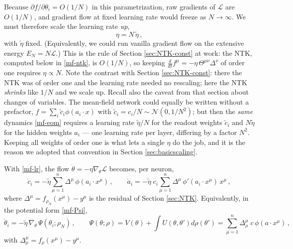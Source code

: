 \documentclass[11pt]{article}
\newcommand{\CN}{{\mathcal N}}
\newcommand{\CL}{{\mathcal L}}
\newcommand{\pd}{\partial}
\begin{document}
Because $\pd f/\pd \theta_i = O(1/N)$ in this parametrization, raw gradients of $\CL$ are $O(1/N)$, and gradient flow at fixed learning rate would freeze as $N\to\infty$. We must therefore scale the learning rate \emph{up},
%
\begin{equation} \label{mf-lr}
    \eta = N\,\tilde\eta\,,
\end{equation}
%
with $\tilde\eta$ fixed. (Equivalently, we could run vanilla gradient flow on the extensive energy $E_N=N\CL$.) This is the rule of Section \ref{sec:NTK-const} at work: the NTK, computed below in \eqref{mf-ntk}, is $O(1/N)$, so keeping $\frac{d}{dt}f^\mu = -\eta\,\Theta^{\mu\nu}\Delta^\nu$ of order one requires $\eta\propto N$. Note the contrast with Section \ref{sec:NTK-const}: there the NTK was of order one and the learning rate needed no rescaling; here the NTK \emph{shrinks} like $1/N$ and we scale up. Recall also the caveat from that section about changes of variables. The mean-field network could equally be written without a prefactor, $f = \sum_i\tilde c_i\phi(a_i\cdot x)$ with $\tilde c_i = c_i/N\sim\CN(0,1/N^2)$; but then the \emph{same} dynamics \eqref{mf-eom} requires a learning rate $\tilde\eta/N$ for the readout weights $\tilde c_i$ and $N\tilde\eta$ for the hidden weights $a_i$ --- one learning rate per layer, differing by a factor $N^2$. Keeping all weights of order one is what lets a single $\eta$ do the job, and it is the reason we adopted that convention in Section \ref{sec:basicscaling}.

With \eqref{mf-lr}, the flow $\dot\theta = -\eta\nabla_\theta\CL$ becomes, per neuron,
%
\begin{equation} \label{mf-eom}
    \dot c_i = -\tilde\eta \sum_{\mu=1}^n \Delta^\mu\, \phi(a_i\cdot x^\mu)\,,\qquad
    \dot a_i = -\tilde\eta\; c_i \sum_{\mu=1}^n \Delta^\mu\, \phi'(a_i\cdot x^\mu)\, x^\mu\,,
\end{equation}
%
where $\Delta^\mu = f_{\rho_N}(x^\mu)-y^\mu$ is the residual of Section \ref{sec:NTK}. Equivalently, in the potential form \eqref{mf-Psi},
%
\begin{equation} \label{mf-eom-Psi}
    \dot\theta_i = -\tilde\eta\,\nabla_\theta\, \Psi(\theta_i;\rho_N)\,,
    \qquad
    \Psi(\theta;\rho) = V(\theta)+\int U(\theta,\theta')d\rho(\theta') = \sum_{\mu=1}^n \Delta^\mu_\rho \; c\,\phi(a\cdot x^\mu)\,,
\end{equation}
%
with $\Delta_\rho^\mu = f_\rho(x^\mu)-y^\mu$.
\end{document}
